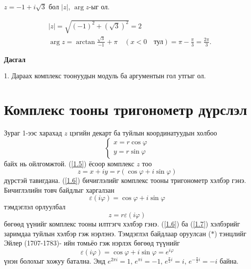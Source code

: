 \begin{exm}
$z=-1+i\sqrt{3}$ бол $|z|$, $\arg  z$-ыг ол. 
\end{exm}
\begin{sol}
\begin{align*}
    & |z|=\sqrt{(-1)^2+(\sqrt{3})^2}=2\\
    & \arg  z=\arctan \frac{\sqrt{3}}{-1}+\pi \quad (x<0 \quad \text{тул}) =\pi -\frac{\pi}{3}=\frac{2\pi}{3}.
\end{align*}
\end{sol}
\begin{center}
    \textbf{Дасгал}
\end{center}
1. Дараах комплекс тоонуудын модуль ба аргументын гол утгыг ол.
\begin{enumerate}
\end{enumerate}
\section{Комплекс тооны тригонометр дүрслэл}
Зураг 1-ээс харахад $z$ цэгийн декарт ба туйлын координатуудын холбоо
\begin{equation} \label{1.5}
\begin{cases}
x=r\cos \varphi \\
y=r\sin\varphi
\end{cases}
\end{equation}
байх нь ойлгомжтой. (\ref{1.5}) ёсоор комплекс $z$ тоо
\begin{equation} \label{1.6}
z=x+iy=r(\cos \varphi+i\sin \varphi)
\end{equation}
дүрстэй тавигдана. (\ref{1.6}) бичиглэлийг комплекс тооны тригонометр хэлбэр гэнэ. Бичиглэлийн товч байдлыг харгалзан
\begin{equation}\tag{$*$}
\varepsilon({i\varphi})=\cos\varphi +i\sin\varphi 
\end{equation}
тэмдэглэл орлуулбал
\begin{equation} \label{1.7}
z=r\varepsilon({i\varphi})
\end{equation}
бөгөөд үүнийг комплекс тооны илтгэгч хэлбэр гэнэ. (\ref{1.6}) ба (\ref{1.7}) хэлбэрийг заримдаа туйлын хэлбэр гэж нэрлэнэ. Тэмдэглэл байдлаар оруулсан (${*}$) тэнцлийг Эйлер (1707-1783)- ийн томьёо гэж нэрлэх бөгөөд түүнийг $$\varepsilon({i\varphi})=\cos\varphi +i\sin\varphi =e^{i\varphi}$$ үнэн болохыг хожуу батална. Энд $e^{2\pi i}=1$, $e^{\pi i}=-1$, $e^{\frac{\pi}{2}i}=i$, $e^{-\frac{\pi}{2}i}=-i$ байна. 

